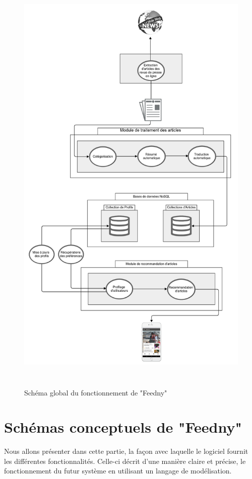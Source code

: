 \begin{figure}[H]
    \centering
    \includegraphics[height=600pt,width=450pt]{img/chapter3/global.png}
    \caption{Schéma global du fonctionnement de "Feedny"}
    \label{shemaglobal}
\end{figure}

\section{Schémas conceptuels de "Feedny"}
Nous allons présenter dans cette partie, la façon avec laquelle le logiciel fournit les différentes fonctionnalités. Celle-ci décrit d'une manière claire et précise, le fonctionnement du futur système en utilisant un langage de modélisation. 

